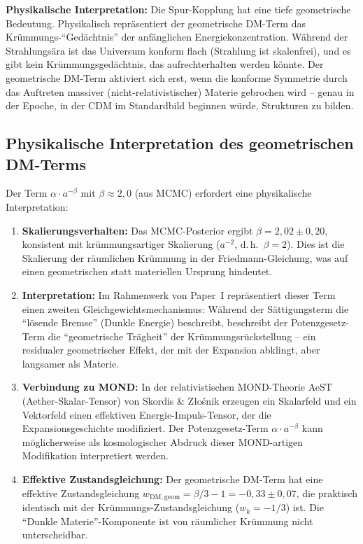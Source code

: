 \documentclass[aps,prd,twocolumn,superscriptaddress,nofootinbib,floatfix]{revtex4-2}
\begin{document}
\textbf{Physikalische Interpretation:} Die Spur-Kopplung hat eine tiefe geometrische Bedeutung. Physikalisch repräsentiert der geometrische DM-Term das Krümmungs-"`Gedächtnis"' der anfänglichen Energiekonzentration. Während der Strahlungsära ist das Universum konform flach (Strahlung ist skalenfrei), und es gibt kein Krümmungsgedächtnis, das aufrechterhalten werden könnte. Der geometrische DM-Term aktiviert sich erst, wenn die konforme Symmetrie durch das Auftreten massiver (nicht-relativistischer) Materie gebrochen wird -- genau in der Epoche, in der CDM im Standardbild beginnen würde, Strukturen zu bilden.

\subsection{Physikalische Interpretation des geometrischen DM-Terms}

Der Term $\alpha \cdot a^{-\beta}$ mit $\beta \approx 2{,}0$ (aus MCMC) erfordert eine physikalische Interpretation:

\begin{enumerate}
\item \textbf{Skalierungsverhalten:} Das MCMC-Posterior ergibt $\beta = 2{,}02 \pm 0{,}20$, konsistent mit krümmungsartiger Skalierung ($a^{-2}$, d.\,h.\ $\beta = 2$). Dies ist die Skalierung der räumlichen Krümmung in der Friedmann-Gleichung, was auf einen geometrischen statt materiellen Ursprung hindeutet.

\item \textbf{Interpretation:} Im Rahmenwerk von Paper~I repräsentiert dieser Term einen zweiten Gleichgewichtsmechanismus: Während der Sättigungsterm die "`lösende Bremse"' (Dunkle Energie) beschreibt, beschreibt der Potenzgesetz-Term die "`geometrische Trägheit"' der Krümmungsrückstellung -- ein residualer geometrischer Effekt, der mit der Expansion abklingt, aber langsamer als Materie.

\item \textbf{Verbindung zu MOND:} In der relativistischen MOND-Theorie AeST (Aether-Skalar-Tensor) von Skordis \& Z{\l}o\'snik \cite{Skordis2021} erzeugen ein Skalarfeld und ein Vektorfeld einen effektiven Energie-Impuls-Tensor, der die Expansionsgeschichte modifiziert. Der Potenzgesetz-Term $\alpha \cdot a^{-\beta}$ kann möglicherweise als kosmologischer Abdruck dieser MOND-artigen Modifikation interpretiert werden.

\item \textbf{Effektive Zustandsgleichung:} Der geometrische DM-Term hat eine effektive Zustandsgleichung $w_{\mathrm{DM,geom}} = \beta/3 - 1 = -0{,}33 \pm 0{,}07$, die praktisch identisch mit der Krümmungs-Zustandsgleichung ($w_k = -1/3$) ist. Die "`Dunkle Materie"'-Komponente ist von räumlicher Krümmung nicht unterscheidbar.
\end{enumerate}
\end{document}
